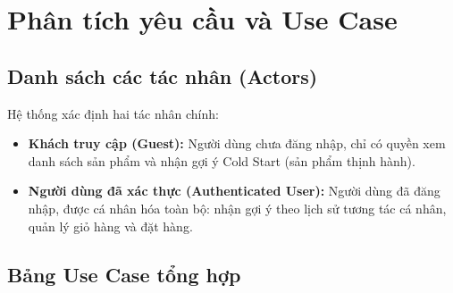 \documentclass{report}
\begin{document}
\section{Phân tích yêu cầu và Use Case}

\subsection{Danh sách các tác nhân (Actors)}

Hệ thống xác định hai tác nhân chính:
\begin{itemize}
    \item \textbf{Khách truy cập (Guest):} Người dùng chưa đăng nhập, chỉ có quyền xem danh sách sản phẩm và nhận gợi ý Cold Start (sản phẩm thịnh hành).
    \item \textbf{Người dùng đã xác thực (Authenticated User):} Người dùng đã đăng nhập, được cá nhân hóa toàn bộ: nhận gợi ý theo lịch sử tương tác cá nhân, quản lý giỏ hàng và đặt hàng.
\end{itemize}

\subsection{Bảng Use Case tổng hợp}
\end{document}
